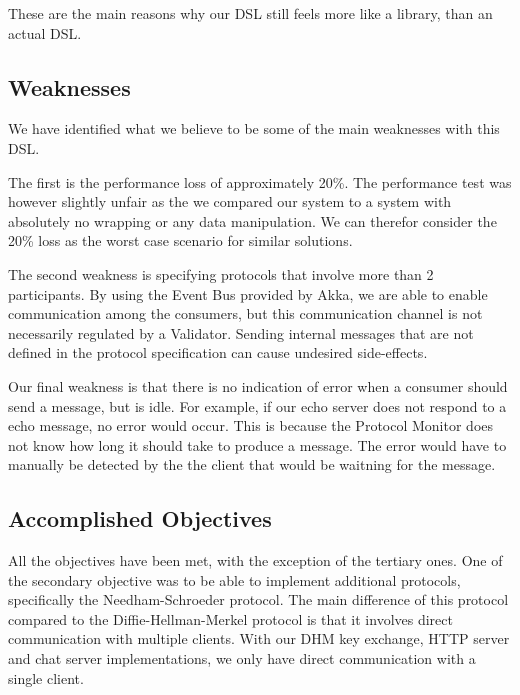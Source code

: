 These are the main reasons why our DSL still feels more like a library, than an actual DSL.
\subsection{Weaknesses}
We have identified what we believe to be some of the main weaknesses with this DSL.

The first is the performance loss of approximately 20\%. The performance test was however slightly unfair as the we compared our system to a system with absolutely no wrapping or any data manipulation. We can therefor consider the 20\% loss as the worst case scenario for similar solutions.

The second weakness is specifying protocols that involve more than 2 participants. By using the Event Bus provided by Akka, we are able to enable communication among the consumers, but this communication channel is not necessarily regulated by a Validator. Sending internal messages that are not defined in the protocol specification can cause undesired side-effects. 

Our final weakness is that there is no indication of error when a consumer should send a message, but is idle. For example, if our echo server does not respond to a echo message, no error would occur. This is because the Protocol Monitor does not know how long it should take to produce a message. The error would have to manually be detected by the the client that would be waitning for the message.



\subsection{Accomplished Objectives}
All the objectives have been met, with the exception of the tertiary ones. One of the secondary objective was to be able to implement additional protocols, specifically the Needham-Schroeder protocol. The main difference of this protocol compared to the Diffie-Hellman-Merkel protocol is that it involves direct communication with multiple clients. With our DHM key exchange, HTTP server and chat server implementations, we only have direct communication with a single client.

